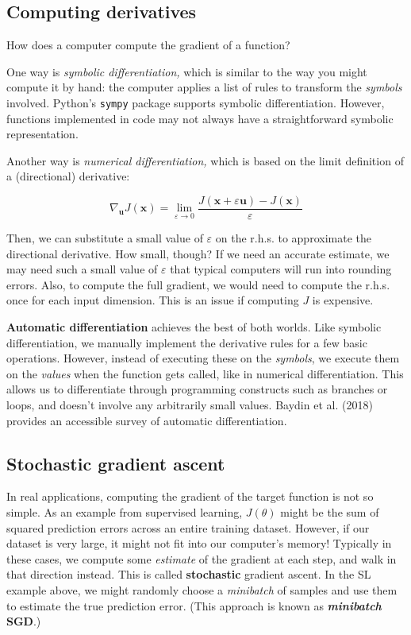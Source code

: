 \documentclass[
  letterpaper,
  DIV=11,
  numbers=noendperiod]{scrreprt}
\theoremstyle{plain}
\theoremstyle{plain}
\theoremstyle{definition}
\theoremstyle{definition}
\theoremstyle{remark}
\begin{document}
\subsection{Computing derivatives}\label{computing-derivatives}

How does a computer compute the gradient of a function?

One way is \emph{symbolic differentiation,} which is similar to the way
you might compute it by hand: the computer applies a list of rules to
transform the \emph{symbols} involved. Python's \texttt{sympy} package
supports symbolic differentiation. However, functions implemented in
code may not always have a straightforward symbolic representation.

Another way is \emph{numerical differentiation,} which is based on the
limit definition of a (directional) derivative:

\[
\nabla_{\boldsymbol{u}} J(\boldsymbol{x}) = \lim_{\varepsilon \to 0}
\frac{J(\boldsymbol{x} + \varepsilon \boldsymbol{u}) - J(\boldsymbol{x})}{\varepsilon}
\]

Then, we can substitute a small value of \(\varepsilon\) on the r.h.s.
to approximate the directional derivative. How small, though? If we need
an accurate estimate, we may need such a small value of \(\varepsilon\)
that typical computers will run into rounding errors. Also, to compute
the full gradient, we would need to compute the r.h.s. once for each
input dimension. This is an issue if computing \(J\) is expensive.

\textbf{Automatic differentiation} achieves the best of both worlds.
Like symbolic differentiation, we manually implement the derivative
rules for a few basic operations. However, instead of executing these on
the \emph{symbols}, we execute them on the \emph{values} when the
function gets called, like in numerical differentiation. This allows us
to differentiate through programming constructs such as branches or
loops, and doesn't involve any arbitrarily small values. Baydin et al.
(2018) provides an accessible survey of automatic differentiation.

\subsection{Stochastic gradient
ascent}\label{stochastic-gradient-ascent}

In real applications, computing the gradient of the target function is
not so simple. As an example from supervised learning, \(J(\theta)\)
might be the sum of squared prediction errors across an entire training
dataset. However, if our dataset is very large, it might not fit into
our computer's memory! Typically in these cases, we compute some
\emph{estimate} of the gradient at each step, and walk in that direction
instead. This is called \textbf{stochastic} gradient ascent. In the SL
example above, we might randomly choose a \emph{minibatch} of samples
and use them to estimate the true prediction error. (This approach is
known as \textbf{\emph{minibatch} SGD}.)
\end{document}
